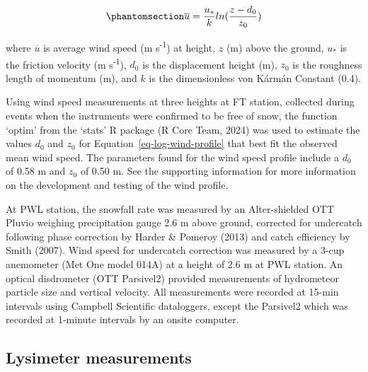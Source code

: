 \documentclass[
  letterpaper,
  DIV=11,
  numbers=noendperiod]{scrartcl}
\begin{document}
\begin{equation}\phantomsection\label{eq-log-wind-profile}{
\overline{u} = \frac{u_*}{k} ln(\frac{z - d_0}{z_0})
}\end{equation}

where \(\overline{u}\) is average wind speed (m s\textsuperscript{-1})
at height, \(z\) (m) above the ground, \(u_*\) is the friction velocity
(m s\textsuperscript{-1}), \(d_0\) is the displacement height (m),
\(z_0\) is the roughness length of momentum (m), and \(k\) is the
dimensionless von Kármán Constant (0.4).

Using wind speed measurements at three heights at FT station, collected
during events when the instruments were confirmed to be free of snow,
the function `optim' from the `stats' R package (R Core Team, 2024) was
used to estimate the values \(d_0\) and \(z_0\) for
Equation~\ref{eq-log-wind-profile} that best fit the observed mean wind
speed. The parameters found for the wind speed profile include a \(d_0\)
of 0.58 m and \(z_0\) of 0.50 m. See the supporting information for more
information on the development and testing of the wind profile.

At PWL station, the snowfall rate was measured by an Alter-shielded OTT
Pluvio weighing precipitation gauge 2.6 m above ground, corrected for
undercatch following phase correction by Harder \& Pomeroy (2013) and
catch efficiency by Smith (2007). Wind speed for undercatch correction
was measured by a 3-cup anemometer (Met One model 014A) at a height of
2.6 m at PWL station. An optical disdrometer (OTT Parsivel2) provided
measurements of hydrometeor particle size and vertical velocity. All
measurements were recorded at 15-min intervals using Campbell Scientific
dataloggers, except the Parsivel2 which was recorded at 1-minute
intervals by an onsite computer.

\subsection{Lysimeter measurements}\label{lysimeter-measurements}
\end{document}
